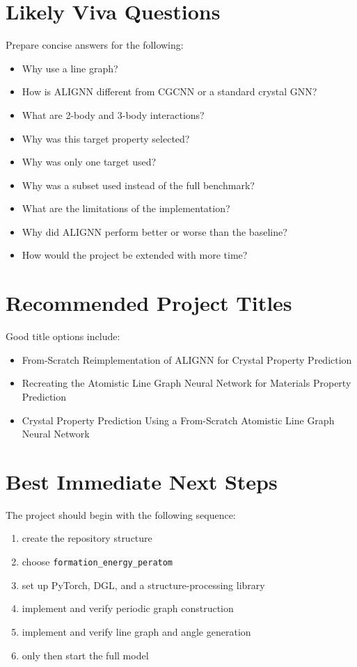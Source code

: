 \documentclass[12pt]{article}
\begin{document}
\section{Likely Viva Questions}
Prepare concise answers for the following:

\begin{itemize}
    \item Why use a line graph?
    \item How is ALIGNN different from CGCNN or a standard crystal GNN?
    \item What are 2-body and 3-body interactions?
    \item Why was this target property selected?
    \item Why was only one target used?
    \item Why was a subset used instead of the full benchmark?
    \item What are the limitations of the implementation?
    \item Why did ALIGNN perform better or worse than the baseline?
    \item How would the project be extended with more time?
\end{itemize}

\section{Recommended Project Titles}
Good title options include:

\begin{itemize}
    \item From-Scratch Reimplementation of ALIGNN for Crystal Property Prediction
    \item Recreating the Atomistic Line Graph Neural Network for Materials Property Prediction
    \item Crystal Property Prediction Using a From-Scratch Atomistic Line Graph Neural Network
\end{itemize}

\section{Best Immediate Next Steps}
The project should begin with the following sequence:

\begin{enumerate}
    \item create the repository structure
    \item choose \texttt{formation\_energy\_peratom}
    \item set up PyTorch, DGL, and a structure-processing library
    \item implement and verify periodic graph construction
    \item implement and verify line graph and angle generation
    \item only then start the full model
\end{enumerate}
\end{document}

